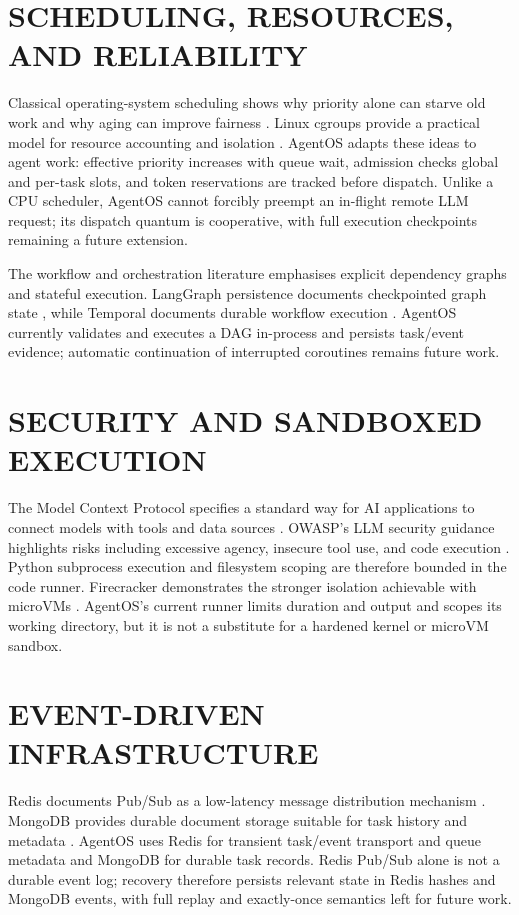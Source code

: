 \section{\uppercase{Scheduling, Resources, and Reliability}}
Classical operating-system scheduling shows why priority alone can starve old work and why aging can improve fairness \cite{silberschatz2018os}. Linux cgroups provide a practical model for resource accounting and isolation \cite{cgroupsv2}. AgentOS adapts these ideas to agent work: effective priority increases with queue wait, admission checks global and per-task slots, and token reservations are tracked before dispatch. Unlike a CPU scheduler, AgentOS cannot forcibly preempt an in-flight remote LLM request; its dispatch quantum is cooperative, with full execution checkpoints remaining a future extension.

The workflow and orchestration literature emphasises explicit dependency graphs and stateful execution. LangGraph persistence documents checkpointed graph state \cite{langgraphpersistence}, while Temporal documents durable workflow execution \cite{temporaldocs}. AgentOS currently validates and executes a DAG in-process and persists task/event evidence; automatic continuation of interrupted coroutines remains future work.

\section{\uppercase{Security and Sandboxed Execution}}
The Model Context Protocol specifies a standard way for AI applications to connect models with tools and data sources \cite{mcpdocs}. OWASP's LLM security guidance highlights risks including excessive agency, insecure tool use, and code execution \cite{owaspllm}. Python subprocess execution and filesystem scoping are therefore bounded in the code runner. Firecracker demonstrates the stronger isolation achievable with microVMs \cite{firecracker}. AgentOS's current runner limits duration and output and scopes its working directory, but it is not a substitute for a hardened kernel or microVM sandbox.

\section{\uppercase{Event-Driven Infrastructure}}
Redis documents Pub/Sub as a low-latency message distribution mechanism \cite{redispubsub}. MongoDB provides durable document storage suitable for task history and metadata \cite{mongodocs}. AgentOS uses Redis for transient task/event transport and queue metadata and MongoDB for durable task records. Redis Pub/Sub alone is not a durable event log; recovery therefore persists relevant state in Redis hashes and MongoDB events, with full replay and exactly-once semantics left for future work.

